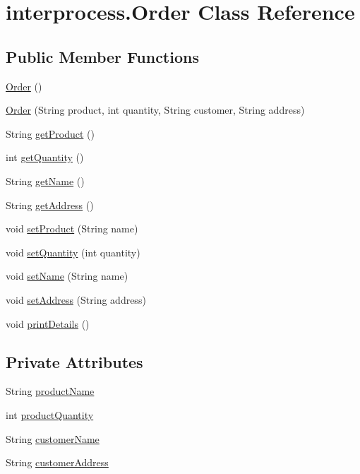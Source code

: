 \hypertarget{classinterprocess_1_1_order}{}\section{interprocess.\+Order Class Reference}
\label{classinterprocess_1_1_order}
\subsection*{Public Member Functions}
\begin{DoxyCompactItemize}
\item 
\hyperlink{classinterprocess_1_1_order_a5e5c6892a7af1a49723b0d5c5406bdd6}{Order} ()
\item 
\hyperlink{classinterprocess_1_1_order_af13a7737eb33a202266166c9c1a59227}{Order} (String product, int quantity, String customer, String address)
\item 
String \hyperlink{classinterprocess_1_1_order_a06e815c40a345dcedbed2765784de66b}{get\+Product} ()
\item 
int \hyperlink{classinterprocess_1_1_order_ad38dbbe0a5126da82d8078b8b3295ce9}{get\+Quantity} ()
\item 
String \hyperlink{classinterprocess_1_1_order_a052b610505ed3911bfd95da17d94aaf9}{get\+Name} ()
\item 
String \hyperlink{classinterprocess_1_1_order_a90730d59b1d16c809a8a5c504c735170}{get\+Address} ()
\item 
void \hyperlink{classinterprocess_1_1_order_a2c98ed99009d1303270a768bb3fdd4f4}{set\+Product} (String name)
\item 
void \hyperlink{classinterprocess_1_1_order_ae25cc04154fec8d5025154eca104f752}{set\+Quantity} (int quantity)
\item 
void \hyperlink{classinterprocess_1_1_order_a175bac96d567d6fe6cc7829275f58451}{set\+Name} (String name)
\item 
void \hyperlink{classinterprocess_1_1_order_a0264f8cb97eb1a9e0bc445b2ea3a6b55}{set\+Address} (String address)
\item 
void \hyperlink{classinterprocess_1_1_order_a780af8945598d5b31d124e0309c4ae65}{print\+Details} ()
\end{DoxyCompactItemize}
\subsection*{Private Attributes}
\begin{DoxyCompactItemize}
\item 
String \hyperlink{classinterprocess_1_1_order_ab22f659fd57c8bde1b362e7054d63f61}{product\+Name}
\item 
int \hyperlink{classinterprocess_1_1_order_a471467d213a750ba99fc21e9d468fe98}{product\+Quantity}
\item 
String \hyperlink{classinterprocess_1_1_order_a15fc1e10e5935f82493a68ebd9ef1a55}{customer\+Name}
\item 
String \hyperlink{classinterprocess_1_1_order_a681c40b962e58237454c9feaae2610d9}{customer\+Address}
\end{DoxyCompactItemize}


